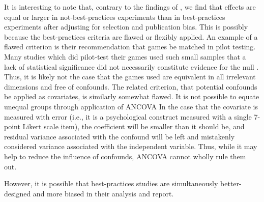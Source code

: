 \documentclass[man]{apa6}
\begin{document}
It is interesting to note that, contrary to the findings of \citet{Anderson:etal:2010}, we find that effects are equal or larger in not-best-practices experiments than in best-practices experiments after adjusting for selection and publication bias. This is possibly because the best-practices criteria are flawed or flexibly applied. An example of a flawed criterion is their recommendation that games be matched in pilot testing. Many studies which did pilot-test their games used such small samples that a lack of statistical significance did not necessarily constitute evidence for the null \citep{Hilgard:etal:2015}. Thus, it is likely not the case that the games used are equivalent in all irrelevant dimensions and free of confounds. The related criterion, that potential confounds be applied as covariates, is similarly somewhat flawed. It is not possible to equate unequal groups through application of ANCOVA \citep{Miller:Chapman:1999} %
In the case that the covariate is measured with error (i.e., it is a psychological construct measured with a single 7-point Likert scale item), the coefficient will be smaller than it should be, and residual variance associated with the confound will be left and mistakenly considered variance associated with the independent variable. Thus, while it may help to reduce the influence of confounds, ANCOVA cannot wholly rule them out.

However, it is possible that best-practices studies are simultaneously better-designed and more biased in their analysis and report. 
\end{document}
